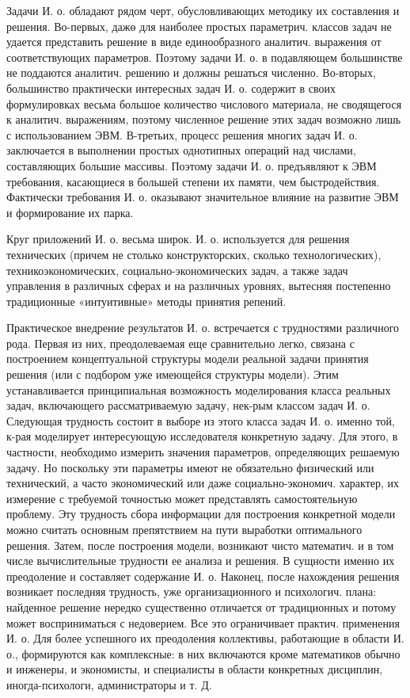 \documentclass[10pt]{article}
\begin{document}
Задачи И. о. обладают рядом черт, обусловливающих методику их составления и решения. Во-первых, дажө для наиболее простых параметрич. классов задач не удается представить решение в виде единообразного аналитич. выражения от соответствующих параметров. Поэтому задачи И. о. в подавляющем большинстве не поддаются аналитич. решению и должны решаться численно. Во-вторых, большинство практически интересных задач И. о. содержит в своих формулировках весьма большое количество числового материала, не сводящегося к аналитич. выражениям, поэтому численное решение этих задач возможно лишь с использованием ЭВМ. В-третьих, процесс решения многих задач И. о. заключается в выполнении простых однотипных операций над числами, составляющих большие массивы. Поэтому задачи И. о. предъявляют к ЭВМ требования, касающиеся в большей степени их памяти, чем быстродействия. Фактически требования И. о. оказывают значительное влияние на развитие ЭВМ и формирование их парка.



Круг приложений И. о. весьма широк. И. о. используется для решения технических (причем не столько конструкторских, сколько технологических), техникоэкономических, социально-экономических задач, а также задач управления в различных сферах и на различных уровнях, вытесняя постепенно традиционные «интуитивные» методы принятия репений.



Практическое внедрение результатов И. о. встречается с трудностями различного рода. Первая из них, преодолеваемая еще сравнительно легко, связана с построением концептуальной структуры модели реальной задачи принятия решения (или с подбором уже имеющейся структуры модели). Этим устанавливается принципиальная возможность моделирования класса реальных задач, включающего рассматриваемую задачу, нек-рым классом задач И. о. Следующая трудность состоит в выборе из этого класса задач И. о. именно той, к-рая моделирует интересующую исследователя конкретную задачу. Для этого, в частности, необходимо измерить значения параметров, определяющих решаемую задачу. Но поскольку эти параметры имеют не обязательно физический или технический, а часто экономический или даже социально-экономич. характер, их измерение с требуемой точностью может представлять самостоятельную проблему. Эту трудность сбора информации для построения конкретной модели можно считать основным препятствием на пути выработки оптимального решения. Затем, после построения модели, возникают чисто математич. и в том числе вычислительные трудности ее анализа и решения. В сущности именно их преодоление и составляет содержание И. о. Наконец, после нахождения решения возникает последняя трудность, уже организационного и психологич. плана: найденное решение нередко существенно отличается от традиционных и потому может восприниматься с недоверием. Все это ограничивает практич. применения И. о. Для более успешного их преодоления коллективы, работающие в области И. о., формируются как комплексные: в них включаются кроме математиков обычно и инженеры, и экономисты, и специалисты в области конкретных дисциплин, иногда-психологи, администраторы и т. Д.
\end{document}
